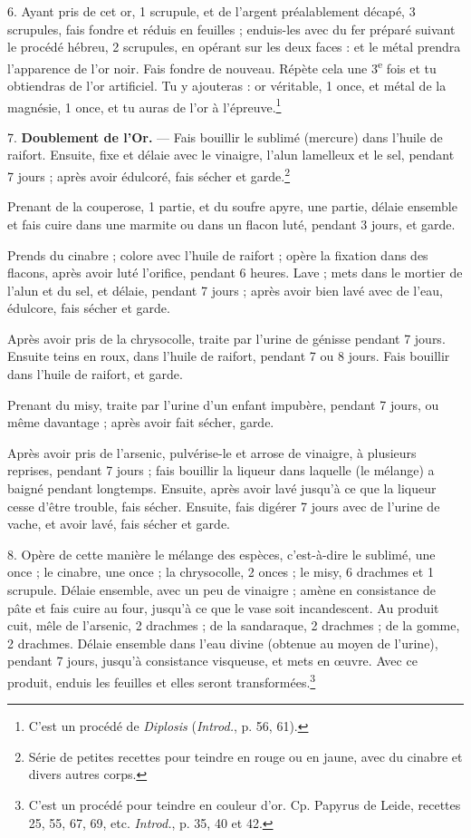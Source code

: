 \documentclass[a4paper, 11pt, oneside, polutonikogreek, french]{article}
\begin{document}
6. Ayant pris de cet or, 1 scrupule, et de l'argent préalablement décapé, 3 scrupules, fais fondre et réduis en feuilles ; enduis-les avec du fer préparé suivant le procédé hébreu, 2 scrupules, en opérant sur les deux faces : et le métal prendra l'apparence de l'or noir. Fais fondre de nouveau. Répète cela une 3\textsuperscript{e} fois et tu obtiendras de l'or artificiel. Tu y ajouteras : or véritable, 1 once, et métal de la magnésie, 1 once, et tu auras de l'or à l'épreuve.\footnote{C'est un procédé de \emph{Diplosis} (\emph{Introd.}, p. 56, 61).}

7. \textbf{Doublement de l'Or.} --- Fais bouillir le sublimé (mercure) dans l'huile de raifort. Ensuite, fixe et délaie avec le vinaigre, l'alun lamelleux et le sel, pendant 7 jours ; après avoir édulcoré, fais sécher et garde.\footnote{Série de petites recettes pour teindre en rouge ou en jaune, avec du cinabre et divers autres corps.}

Prenant de la couperose, 1 partie, et du soufre apyre, une partie, délaie ensemble et fais cuire dans une marmite ou dans un flacon luté, pendant 3 jours, et garde.

Prends du cinabre ; colore avec l'huile de raifort ; opère la fixation dans des flacons, après avoir luté l'orifice, pendant 6 heures. Lave ; mets dans le mortier de l'alun et du sel, et délaie, pendant 7 jours ; après avoir bien lavé avec de l'eau, édulcore, fais sécher et garde.

Après avoir pris de la chrysocolle, traite par l'urine de génisse pendant 7 jours. Ensuite teins en roux, dans l'huile de raifort, pendant 7 ou 8 jours. Fais bouillir dans l'huile de raifort, et garde.

Prenant du misy, traite par l'urine d'un enfant impubère, pendant 7 jours, ou même davantage ; après avoir fait sécher, garde.

Après avoir pris de l'arsenic, pulvérise-le et arrose de vinaigre, à plusieurs reprises, pendant 7 jours ; fais bouillir la liqueur dans laquelle (le mélange) a baigné pendant longtemps. Ensuite, après avoir lavé jusqu'à ce que la liqueur cesse d'être trouble, fais sécher. Ensuite, fais digérer 7 jours avec de l'urine de vache, et avoir lavé, fais sécher et garde.

8. Opère de cette manière le mélange des espèces, c'est-à-dire le sublimé, une once ; le cinabre, une once ; la chrysocolle, 2 onces ; le misy, 6 drachmes et 1 scrupule. Délaie ensemble, avec un peu de vinaigre ; amène en consistance de pâte et fais cuire au four, jusqu'à ce que le vase soit incandescent. Au produit cuit, mêle de l'arsenic, 2 drachmes ; de la sandaraque, 2 drachmes ; de la gomme, 2 drachmes. Délaie ensemble dans l'eau divine (obtenue au moyen de l'urine), pendant 7 jours, jusqu'à consistance visqueuse, et mets en œuvre. Avec ce produit, enduis les feuilles et elles seront transformées.\footnote{C'est un procédé pour teindre en couleur d'or. Cp. Papyrus de Leide, recettes 25, 55, 67, 69, etc. \emph{Introd.}, p. 35, 40 et 42.}
\end{document}
